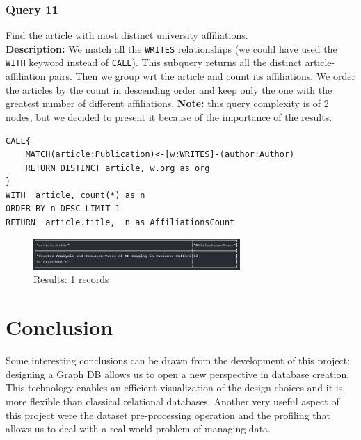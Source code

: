 \documentclass{Configuration_Files/PoliMi3i_thesis}
\begin{document}
\subsection{Query 11}
Find the article with most distinct university affiliations.\\
\textbf{Description:} We match all the \verb |WRITES| relationships (we could have used the \verb |WITH| keyword instead
of \verb |CALL|). This subquery returns all the distinct article-affiliation pairs. Then we group wrt the article and
count its affiliations. We order the articles by the count in descending order and keep only the one with the greatest
number of different affiliations.
\textbf{Note:} this query complexity is of 2 nodes, but we decided to present it because of the importance of the results.
\begin{lstlisting}[language=cypher, label=lst:cypher-example]
CALL{
    MATCH(article:Publication)<-[w:WRITES]-(author:Author)
    RETURN DISTINCT article, w.org as org
}
WITH  article, count(*) as n
ORDER BY n DESC LIMIT 1
RETURN  article.title,  n as AffiliationsCount
\end{lstlisting}
\begin{figure}[H]
\centering
\includegraphics[width=0.7\textwidth]{query/query11.PNG}
\caption{Results: 1 records}
\label{fig:query11}
\end{figure}


\chapter{Conclusion}
Some interesting conclusions can be drawn from the development of this project: designing a Graph DB allows us to open a new
perspective in database creation. This technology enables an efficient visualization of the design choices and it is more
flexible than classical relational databases. \newline
Another very useful aspect of this project were the dataset pre-processing operation and the profiling that allows us to deal
with a real world problem of managing data.
\end{document}
